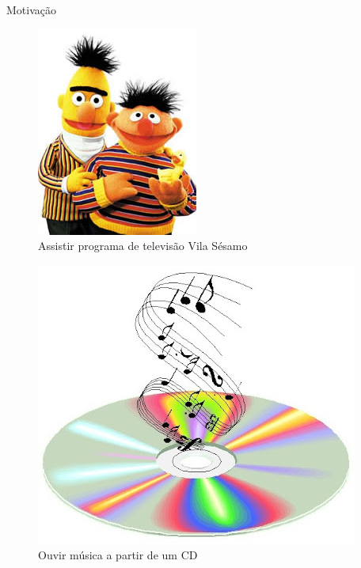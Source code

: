   \begin{frame}{Motivação}
   \begin{figure}[h]
     \centering
     \includegraphics[scale=.3]{enio-beto.jpg}
     \caption{Assistir programa de televisão Vila Sésamo\cite{Plank:2004}}
     \label{fig7:tv}
   \end{figure}

   \begin{figure}[h]
     \centering
     \includegraphics[scale=0.2]{music_cd.jpg}
     \caption{Ouvir música a partir de um CD\cite{Plank:2004}}
     \label{fig8:cd}
   \end{figure}
  \end{frame}

